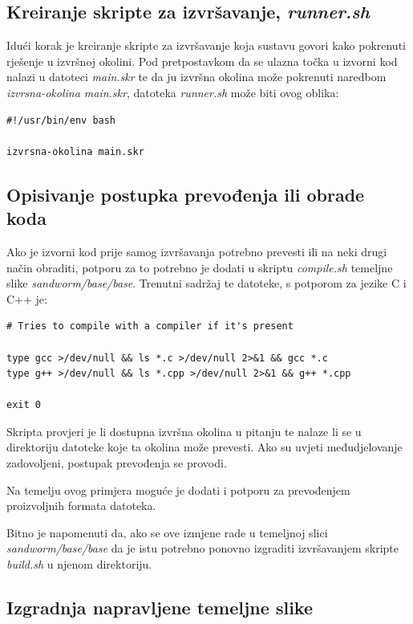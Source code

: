 \documentclass[times, utf8, zavrsni]{fer}
\begin{document}
{{{\begin{appendices}
\subsection{Kreiranje skripte za izvršavanje, {\textit{runner.sh}}}

Idući korak je kreiranje skripte za izvršavanje koja sustavu govori kako pokrenuti rješenje u izvršnoj okolini. Pod pretpostavkom da se ulazna točka u izvorni kod nalazi u datoteci {\textit{main.skr}} te da ju izvršna okolina može pokrenuti naredbom {\textit{izvrsna-okolina main.skr}}, datoteka {\textit{runner.sh}} može biti ovog oblika:

\begin{lstlisting}
#!/usr/bin/env bash

izvrsna-okolina main.skr
\end{lstlisting}

\subsection{Opisivanje postupka prevođenja ili obrade koda}

Ako je izvorni kod prije samog izvršavanja potrebno prevesti ili na neki drugi način obraditi, potporu za to potrebno je dodati u skriptu {\textit{compile.sh}} temeljne slike {\textit{sandworm/base/base}}. Trenutni sadržaj te datoteke, s potporom za jezike C i C++ je:

\begin{lstlisting}
# Tries to compile with a compiler if it's present

type gcc >/dev/null && ls *.c >/dev/null 2>&1 && gcc *.c
type g++ >/dev/null && ls *.cpp >/dev/null 2>&1 && g++ *.cpp

exit 0
\end{lstlisting}

Skripta provjeri je li dostupna izvršna okolina u pitanju te nalaze li se u direktoriju datoteke koje ta okolina može prevesti. Ako su uvjeti međudjelovanje zadovoljeni, postupak prevođenja se provodi.

Na temelju ovog primjera moguće je dodati i potporu za prevođenjem proizvoljnih formata datoteka.

Bitno je napomenuti da, ako se ove izmjene rade u temeljnoj slici {\textit{sandworm/base/base}} da je istu potrebno ponovno izgraditi izvršavanjem skripte {\textit{build.sh}} u njenom direktoriju.

\subsection{Izgradnja napravljene temeljne slike}


\end{appendices}}}}
\end{document}
